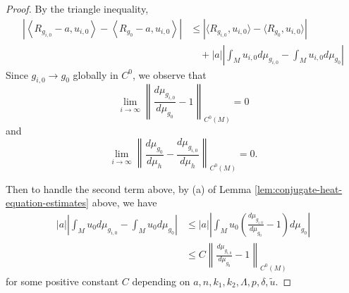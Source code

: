 \documentclass[12pt]{amsart}
\theoremstyle{plain}
\theoremstyle{plain}
\theoremstyle{definition}
\theoremstyle{remark}
\numberwithin{equation}{subsection}
\begin{document}
\begin{proof}
    By the triangle inequality,
    \begin{align*}
        \left|\left\langle R_{g_{i,0}}-a, u_{i,0}\right\rangle - \left\langle R_{g_0} - a, u_{i,0}\right\rangle \right| &\leq \left|\langle R_{g_{i,0}},u_{i,0}\rangle - \langle R_{g_0}, u_{i,0}\rangle\right| \nonumber \\
        &\quad + |a|\left|\int_M u_{i,0} d\mu_{g_{i,0}} - \int_M u_{i,0} d\mu_{g_0}\right|
    \end{align*}
    Since $g_{i,0} \to g_0$ globally in $C^0$, we observe that 
    \begin{equation*}
        \lim\limits_{i\to\infty}\left\lVert \frac{d\mu_{g_{i,0}}}{d\mu_{g_0}} - 1\right\rVert_{C^0(M)} = 0
    \end{equation*}
and
    \begin{equation*}
        \lim\limits_{i\to\infty}\left\lVert \frac{d\mu_{g_0}}{d\mu_h} - \frac{d\mu_{g_{i,0}}}{d\mu_h}\right\rVert_{C^0(M)} = 0.
    \end{equation*}

    Then to handle the second term above, by (a) of Lemma \ref{lem:conjugate-heat-equation-estimates} above, we have
    \begin{align*}
        |a|\left|\int_M u_0 d\mu_{g_{i,0}} - \int_M u_0 d\mu_{g_0}\right| &\leq |a|\left|\int_M u_0\left(\frac{d\mu_{g_{i,0}}}{d\mu_{g_0}} - 1\right)d\mu_{g_0}\right| \nonumber \\
        &\leq C\left\lVert \frac{d\mu_{g_{i,0}}}{d\mu_{g_0}} - 1\right\rVert_{C^0(M)}
    \end{align*}
    for some positive constant $C$ depending on $a, n, k_1, k_2, \Lambda, p, \delta, \tilde{u}$.


\end{proof}
\end{document}
